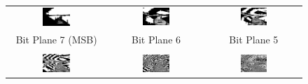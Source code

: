\documentclass{article}
\begin{document}
\begin{figure}[H]
    \centering
    \begin{tabular}{ccc}
        \includegraphics[width=0.3\textwidth]{images/bit_plane_7.png} &
        \includegraphics[width=0.3\textwidth]{images/bit_plane_6.png} &
        \includegraphics[width=0.3\textwidth]{images/bit_plane_5.png} \\
        Bit Plane 7 (MSB) & Bit Plane 6 & Bit Plane 5 \\
        \\
        \includegraphics[width=0.3\textwidth]{images/bit_plane_4.png} &
        \includegraphics[width=0.3\textwidth]{images/bit_plane_3.png} &
        \includegraphics[width=0.3\textwidth]{images/bit_plane_2.png} \\

\end{tabular}
\end{figure}
\end{document}
